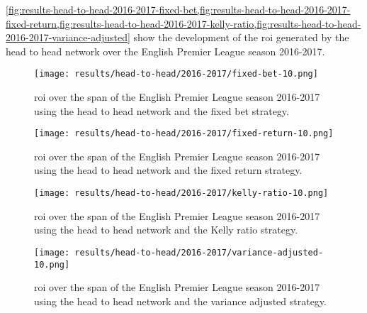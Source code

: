 \cref{fig:results-head-to-head-2016-2017-fixed-bet,fig:results-head-to-head-2016-2017-fixed-return,fig:results-head-to-head-2016-2017-kelly-ratio,fig:results-head-to-head-2016-2017-variance-adjusted} show the development of the \gls{roi} generated by the head to head network over the English Premier League season 2016-2017.
\begin{figure}
    \centering
    \texttt{[image: results/head-to-head/2016-2017/fixed-bet-10.png]}
    \caption{\gls{roi} over the span of the English Premier League season 2016-2017 using the head to head network and the fixed bet strategy.}
    \label{fig:results-head-to-head-2016-2017-fixed-bet}
\end{figure}
\begin{figure}
    \centering
    \texttt{[image: results/head-to-head/2016-2017/fixed-return-10.png]}
    \caption{\gls{roi} over the span of the English Premier League season 2016-2017 using the head to head network and the fixed return strategy.}
    \label{fig:results-head-to-head-2016-2017-fixed-return}
\end{figure}
\begin{figure}
    \centering
    \texttt{[image: results/head-to-head/2016-2017/kelly-ratio-10.png]}
    \caption{\gls{roi} over the span of the English Premier League season 2016-2017 using the head to head network and the Kelly ratio strategy.}
    \label{fig:results-head-to-head-2016-2017-kelly-ratio}
\end{figure}
\begin{figure}
    \centering
    \texttt{[image: results/head-to-head/2016-2017/variance-adjusted-10.png]}
    \caption{\gls{roi} over the span of the English Premier League season 2016-2017 using the head to head network and the variance adjusted strategy.}
    \label{fig:results-head-to-head-2016-2017-variance-adjusted}
\end{figure}

